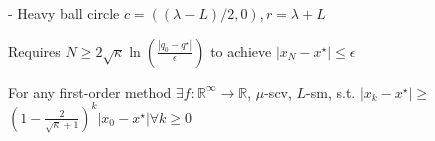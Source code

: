 - Heavy ball circle $c=((\lambda -L)/2 ,0), r= \lambda +L$


Requires
$N\ge2\sqrt{\kappa}\operatorname{ln}(\frac{|q_{0}-q^\star|}{\epsilon})$
to achieve
$|x_{N}-x^\star|\le\epsilon$

\begin{theorem}
	For any first-order method
	$\exists f: \mathbb{R}^{\infty}\rightarrow\mathbb{R}$,
	$\mu$-scv, $L$-sm,
	s.t.
	$|x_k - x^\star|\ge$
	$(1-\frac{2}{\sqrt{\kappa}+1})^k|x_0 - x^\star| \forall k\ge 0$

\end{theorem}


